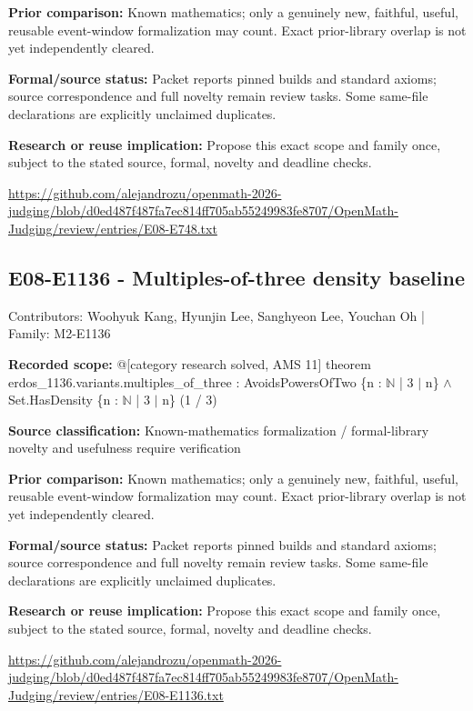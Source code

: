 \documentclass[11pt,a4paper]{article}
\begin{document}
\textbf{Prior comparison:} Known mathematics; only a genuinely new, faithful, useful, reusable event-window formalization may count. Exact prior-library overlap is not yet independently cleared.

\textbf{Formal/source status:} Packet reports pinned builds and standard axioms; source correspondence and full novelty remain review tasks. Some same-file declarations are explicitly unclaimed duplicates.

\textbf{Research or reuse implication:} Propose this exact scope and family once, subject to the stated source, formal, novelty and deadline checks.

{\small \url{https://github.com/alejandrozu/openmath-2026-judging/blob/d0ed487f487fa7ec814ff705ab55249983fe8707/OpenMath-Judging/review/entries/E08-E748.txt}\par}

\begin{samepage}
\subsection{E08-E1136  -  Multiples-of-three density baseline}
{\small Contributors: Woohyuk Kang, Hyunjin Lee, Sanghyeon Lee, Youchan Oh | Family: M2-E1136\par}

\textbf{Recorded scope:} @[category research solved, AMS 11] theorem erdos\_1136.variants.multiples\_of\_three : AvoidsPowersOfTwo \{n : \ensuremath{\mathbb{N}} | 3 \ensuremath{\mid} n\} \ensuremath{\wedge} Set.HasDensity \{n : \ensuremath{\mathbb{N}} | 3 \ensuremath{\mid} n\} (1 / 3)


\end{samepage}
\textbf{Source classification:} Known-mathematics formalization / formal-library novelty and usefulness require verification

\textbf{Prior comparison:} Known mathematics; only a genuinely new, faithful, useful, reusable event-window formalization may count. Exact prior-library overlap is not yet independently cleared.

\textbf{Formal/source status:} Packet reports pinned builds and standard axioms; source correspondence and full novelty remain review tasks. Some same-file declarations are explicitly unclaimed duplicates.

\textbf{Research or reuse implication:} Propose this exact scope and family once, subject to the stated source, formal, novelty and deadline checks.

{\small \url{https://github.com/alejandrozu/openmath-2026-judging/blob/d0ed487f487fa7ec814ff705ab55249983fe8707/OpenMath-Judging/review/entries/E08-E1136.txt}\par}
\end{document}
